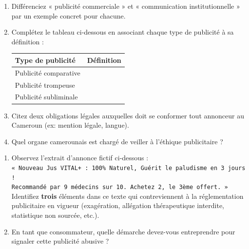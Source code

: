 \documentclass[11pt]{article}
\begin{document}
\begin{exercice}
\begin{enumerate}
    \item Différenciez « publicité commerciale » et « communication institutionnelle » par un exemple concret pour chacune.
    \item Complétez le tableau ci-dessous en associant chaque type de publicité à sa définition :
    \begin{center}
    \begin{tabular}{|p{3.5cm}|p{10cm}|}
    \hline
    \textbf{Type de publicité} & \textbf{Définition} \\ \hline
    Publicité comparative & \\ \hline
    Publicité trompeuse & \\ \hline
    Publicité subliminale & \\ \hline
    \end{tabular}
    \end{center}
    \item Citez deux obligations légales auxquelles doit se conformer tout annonceur au Cameroun (ex: mention légale, langue).
    \item Quel organe camerounais est chargé de veiller à l'éthique publicitaire ?
\end{enumerate}
\end{exercice}

\begin{exercice}
\begin{enumerate}
    \item Observez l'extrait d'annonce fictif ci-dessous : \\
    \texttt{« Nouveau Jus VITAL+ : 100\% Naturel, Guérit le paludisme en 3 jours ! }\\
    \texttt{Recommandé par 9 médecins sur 10. Achetez 2, le 3ème offert. »} \\
    Identifiez \textbf{trois} éléments dans ce texte qui contreviennent à la réglementation publicitaire en vigueur (exagération, allégation thérapeutique interdite, statistique non sourcée, etc.).
    \item En tant que consommateur, quelle démarche devez-vous entreprendre pour signaler cette publicité abusive ?
\end{enumerate}
\end{exercice}
\end{document}
